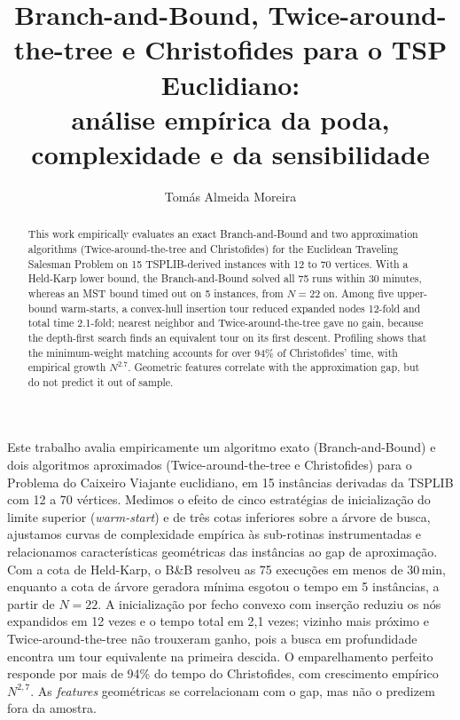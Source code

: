 \documentclass[12pt]{article}
\title{Branch-and-Bound, Twice-around-the-tree e Christofides para o TSP Euclidiano:\\
análise empírica da poda, complexidade e da sensibilidade}
\author{Tomás Almeida Moreira}
\begin{document}
\maketitle

\begin{abstract}
  This work empirically evaluates an exact Branch-and-Bound and two approximation
  algorithms (Twice-around-the-tree and Christofides) for the Euclidean Traveling
  Salesman Problem on 15 TSPLIB-derived instances with 12 to 70 vertices. With a
  Held-Karp lower bound, the Branch-and-Bound solved all 75 runs within 30 minutes,
  whereas an MST bound timed out on 5 instances, from $N=22$ on. Among five
  upper-bound warm-starts, a convex-hull insertion tour reduced expanded nodes 12-fold
  and total time 2.1-fold; nearest neighbor and Twice-around-the-tree gave no gain,
  because the depth-first search finds an equivalent tour on its first descent.
  Profiling shows that the minimum-weight matching accounts for over 94\% of
  Christofides' time, with empirical growth $N^{2.7}$. Geometric features correlate
  with the approximation gap, but do not predict it out of sample.
\end{abstract}

\begin{resumo}
  Este trabalho avalia empiricamente um algoritmo exato (Branch-and-Bound) e dois
  algoritmos aproximados (Twice-around-the-tree e Christofides) para o Problema do
  Caixeiro Viajante euclidiano, em 15 instâncias derivadas da TSPLIB com 12 a 70
  vértices. Medimos o efeito de cinco estratégias de inicialização do limite superior
  (\textit{warm-start}) e de três cotas inferiores sobre a árvore de busca, ajustamos
  curvas de complexidade empírica às sub-rotinas instrumentadas e relacionamos
  características geométricas das instâncias ao gap de aproximação. Com a cota de
  Held-Karp, o B\&B resolveu as 75 execuções em menos de 30\,min, enquanto a cota de
  árvore geradora mínima esgotou o tempo em 5 instâncias, a partir de $N=22$. A
  inicialização por fecho convexo com inserção reduziu os nós expandidos em 12 vezes e o
  tempo total em 2,1 vezes; vizinho mais próximo e Twice-around-the-tree não trouxeram
  ganho, pois a busca em profundidade encontra um tour equivalente na primeira descida.
  O emparelhamento perfeito responde por mais de 94\% do tempo do Christofides, com
  crescimento empírico $N^{2,7}$. As \textit{features} geométricas se correlacionam com o
  gap, mas não o predizem fora da amostra.
\end{resumo}
\end{document}
